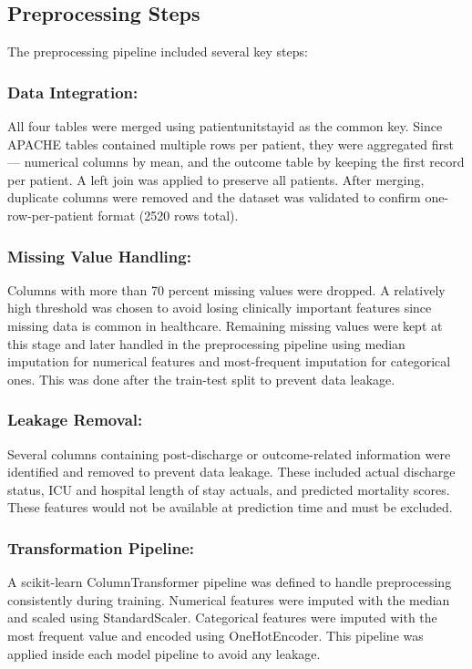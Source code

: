 \documentclass[11pt]{article}
\begin{document}
\subsection{Preprocessing Steps
} The preprocessing pipeline included several key steps:

\subsubsection{Data Integration:
} All four tables were merged using patientunitstayid as the common key. Since APACHE tables contained multiple rows per patient, they were aggregated first — numerical columns by mean, and the outcome table by keeping the first record per patient. A left join was applied to preserve all patients. After merging, duplicate columns were removed and the dataset was validated to confirm one-row-per-patient format (2520 rows total).

\subsubsection{Missing Value Handling:}
Columns with more than 70 percent missing values were dropped. A relatively high threshold was chosen to avoid losing clinically important features since missing data is common in healthcare. Remaining missing values were kept at this stage and later handled in the preprocessing pipeline using median imputation for numerical features and most-frequent imputation for categorical ones. This was done after the train-test split to prevent data leakage.

\subsubsection{Leakage Removal:
} Several columns containing post-discharge or outcome-related information were identified and removed to prevent data leakage. These included actual discharge status, ICU and hospital length of stay actuals, and predicted mortality scores. These features would not be available at prediction time and must be excluded.

\subsubsection{Transformation Pipeline:
} A scikit-learn ColumnTransformer pipeline was defined to handle preprocessing consistently during training. Numerical features were imputed with the median and scaled using StandardScaler. Categorical features were imputed with the most frequent value and encoded using OneHotEncoder. This pipeline was applied inside each model pipeline to avoid any leakage.
\end{document}
